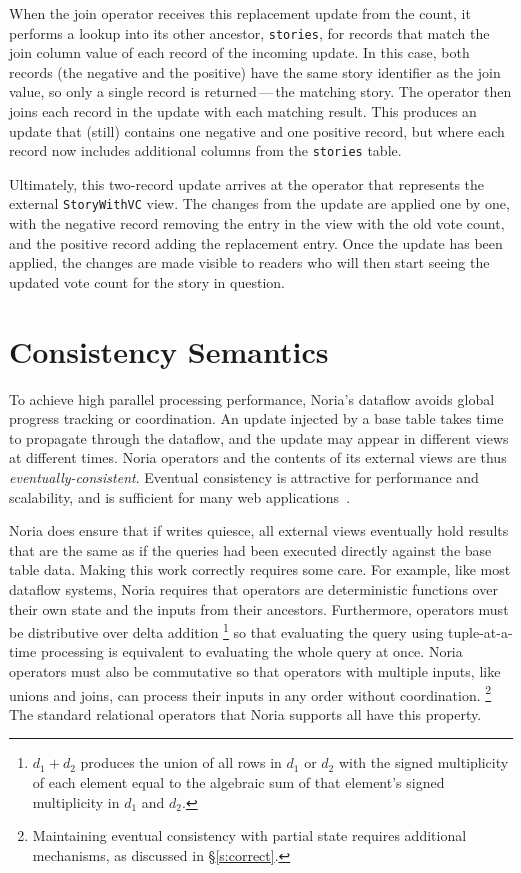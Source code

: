 When the join operator receives this replacement update from the count, it
performs a lookup into its other ancestor, \texttt{stories}, for records that
match the join column value of each record of the incoming update. In this case,
both records (the negative and the positive) have the same story identifier as
the join value, so only a single record is returned\,---\,the matching story.
The operator then joins each record in the update with each matching result.
This produces an update that (still) contains one negative and one positive
record, but where each record now includes additional columns from the
\texttt{stories} table.

Ultimately, this two-record update arrives at the operator that represents the
external \texttt{StoryWithVC} view. The changes from the update are applied one
by one, with the negative record removing the entry in the view with the old
vote count, and the positive record adding the replacement entry. Once the
update has been applied, the changes are made visible to readers who will then
start seeing the updated vote count for the story in question.

\section{Consistency Semantics}

To achieve high parallel processing performance, Noria's dataflow avoids
global progress tracking or coordination. An update injected by a base table
takes time to propagate through the dataflow, and the update may appear in
different views at different times. Noria operators and the contents of its
external views are thus \emph{eventually-consistent}. Eventual consistency is
attractive for performance and scalability, and is sufficient for many web
applications~\cite{eventually-consistent, memcached-facebook, pnuts}.

Noria does ensure that if writes quiesce, all external views eventually hold
results that are the same as if the queries had been executed directly against
the base table data. Making this work correctly requires some care. For example,
like most dataflow systems, Noria requires that operators are deterministic
functions over their own state and the inputs from their ancestors. Furthermore,
operators must be distributive over delta addition%
\footnote{$d_1 + d_2$ produces the union of all rows in $d_1$ or $d_2$ with the
signed multiplicity of each element equal to the algebraic sum of that element's
signed multiplicity in $d_1$ and $d_2$.}
so that evaluating the query using tuple-at-a-time processing is equivalent to
evaluating the whole query at once. Noria operators must also be commutative so
that operators with multiple inputs, like unions and joins, can process their
inputs in any order without coordination.%
\footnote{Maintaining eventual consistency with partial state requires
additional mechanisms, as discussed in \S\ref{s:correct}.}
The standard relational operators that Noria supports all have this property.

